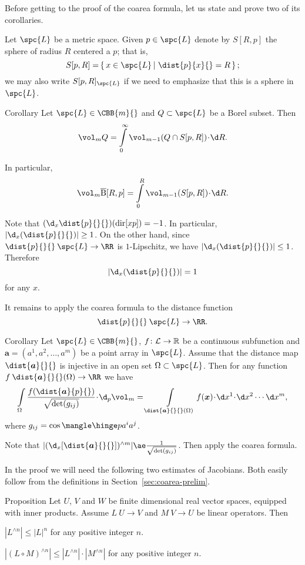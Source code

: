 Before getting to the proof of the coarea formula,
let us state and prove two of its corollaries.

Let $\spc{L}$ be a metric space.
Given $p\in \spc{L}$ denote by $S[R,p]$
the sphere of radius $R$ centered a $p$;
that is,
\[S[p,R]=\set{x\in\spc{L}}{\dist{p}{x}{}=R};\]
we may also write $S[p,R]_{\spc{L}}$ if we need to emphasize 
that this is a sphere in $\spc{L}$.


\begin{thm}{Corollary}\label{cor:coarea-for-dist-function}
Let $\spc{L}\in\CBB{m}{}$
and $Q\subset\spc{L}$ be a Borel subset.
Then 
\[\vol_m Q=\int\limits_0^\infty\vol_{m-1}(Q\cap S[p,R])\cdot\d R.\]

In particular,
\[\vol_m \cBall[R,p]=\int\limits_0^R\vol_{m-1}(S[p,R])\cdot\d R.\]


\end{thm}

Note that
$(\d_x\dist{p}{}{})(\dir xp)=-1$.
In particular, $|\d_x(\dist{p}{}{})|\ge 1$.
On the other hand, since $\dist{p}{}{}\:\spc{L}\to\RR$ is $1$-Lipschitz,
we have
$|\d_x(\dist{p}{}{})|\le 1$.
Therefore
\[|\d_x(\dist{p}{}{})|= 1\] 
for any $x$.

It remains to apply the coarea formula to the distance function 
\[\dist{p}{}{}\:\spc{L}\to\RR.\]
\qedsf

\begin{thm}{Corollary}\label{cor:coarea-for-dist-map}
Let $\spc{L}\in\CBB{m}{}$,
$f\:\spc{L}\to\RR$ be a continuous subfunction
and $\bm{a}=(a^1,a^2,\dots,a^m)$ be a point array in $\spc{L}$.
Assume that the distance map $\dist{\bm{a}}{}{}$ 
 is injective in an open set $\Omega\subset\spc{L}$.
Then for any function $f\:\dist{\bm{a}}{}{}(\Omega)\to\RR$ 
we have
\[\int\limits_{\Omega} \frac{f(\dist{\bm{a}}{p}{})}{\sqrt{\det(g_{ij})}}\cdot\d_p\vol_m
=
\int\limits_{\dist{\bm{a}}{}{}(\Omega)} f(\bm{x})\cdot\d x^1\cdot\d x^2\cdots\d x^m,\]
where $g_{ij}=\cos\mangle\hinge p{a^i}{a^j}$.
\end{thm}

Note that $|(\d_x[\dist{\bm{a}}{}{}])^{\wedge m}|\ae \frac1{\sqrt{\det(g_{ij})}}$.
Then apply the coarea formula.
\qeds

In the proof we will need the following two estimates of Jacobians.
Both easily follow from the definitions in Section~\ref{sec:coarea-prelim}.

\begin{thm}{Proposition}\label{prop:lin-algebra-1}
Let $U$, $V$ and $W$ 
be finite dimensional real vector spaces, equipped with inner products.
Assume $L\:U\to V$ and $M\: V\to U$ be linear operators.
Then 
\begin{subthm}{}
$|L^{\wedge n}|\le |L|^{ n}$ for any positive integer $n$.
\end{subthm}

\begin{subthm}{}
$|(L\circ M)^{\wedge n}|\le |L^{\wedge n}|\cdot |M^{\wedge n}|$ for any positive integer $n$.
\end{subthm}

\end{thm}


